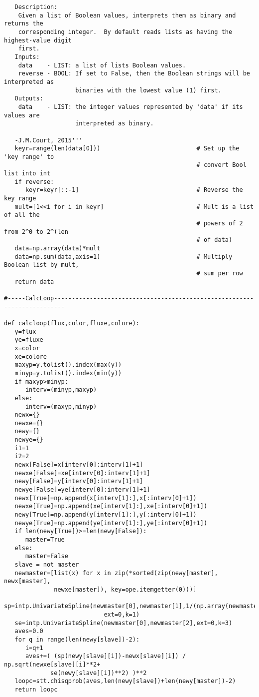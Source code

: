 \begin{verbatim}
   Description:
    Given a list of Boolean values, interprets them as binary and returns the 
    corresponding integer.  By default reads lists as having the highest-value digit
    first.
   Inputs:
    data    - LIST: a list of lists Boolean values.
    reverse - BOOL: If set to False, then the Boolean strings will be interpreted as
                    binaries with the lowest value (1) first.
   Outputs:
    data    - LIST: the integer values represented by 'data' if its values are
                    interpreted as binary.

   -J.M.Court, 2015'''
   keyr=range(len(data[0]))                           # Set up the 'key range' to
                                                      # convert Bool list into int
   if reverse:
      keyr=keyr[::-1]                                 # Reverse the key range
   mult=[1<<i for i in keyr]                          # Mult is a list of all the
                                                      # powers of 2 from 2^0 to 2^(len
                                                      # of data)
   data=np.array(data)*mult
   data=np.sum(data,axis=1)                           # Multiply Boolean list by mult,
                                                      # sum per row
   return data

#-----CalcLoop-------------------------------------------------------------------------

def calcloop(flux,color,fluxe,colore):
   y=flux
   ye=fluxe
   x=color
   xe=colore
   maxyp=y.tolist().index(max(y))
   minyp=y.tolist().index(min(y))
   if maxyp>minyp:
      interv=(minyp,maxyp)
   else:
      interv=(maxyp,minyp)
   newx={}
   newxe={}
   newy={}
   newye={}
   i1=1
   i2=2
   newx[False]=x[interv[0]:interv[1]+1]
   newxe[False]=xe[interv[0]:interv[1]+1]
   newy[False]=y[interv[0]:interv[1]+1]
   newye[False]=ye[interv[0]:interv[1]+1]
   newx[True]=np.append(x[interv[1]:],x[:interv[0]+1])
   newxe[True]=np.append(xe[interv[1]:],xe[:interv[0]+1])
   newy[True]=np.append(y[interv[1]:],y[:interv[0]+1])
   newye[True]=np.append(ye[interv[1]:],ye[:interv[0]+1])
   if len(newy[True])>=len(newy[False]):
      master=True
   else:
      master=False
   slave = not master
   newmaster=[list(x) for x in zip(*sorted(zip(newy[master], newx[master],
              newxe[master]), key=ope.itemgetter(0)))]
   sp=intp.UnivariateSpline(newmaster[0],newmaster[1],1/(np.array(newmaster[2])**2),
                            ext=0,k=1)
   se=intp.UnivariateSpline(newmaster[0],newmaster[2],ext=0,k=3)
   aves=0.0
   for q in range(len(newy[slave])-2):
      i=q+1
      aves+=( (sp(newy[slave][i])-newx[slave][i]) / np.sqrt(newxe[slave][i]**2+
             se(newy[slave][i])**2) )**2   
   loopc=stt.chisqprob(aves,len(newy[slave])+len(newy[master])-2)
   return loopc


\end{verbatim}
